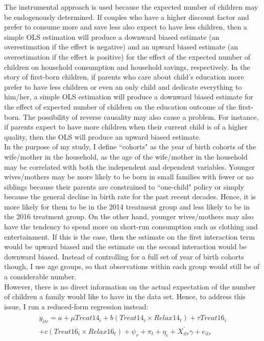 \documentclass[12pt]{extarticle}
\begin{document}
\indent The instrumental approach is used because the expected number of children may be endogenously determined. If couples who have a higher discount factor and prefer to consume more and save less also expect to have less children, then a simple OLS estimation will produce a downward biased estimate (an overestimation if the effect is negative) and an upward biased estimate (an overestimation if the effect is positive) for the effect of the expected number of children on household consumption and household savings, respectively. In the story of first-born children, if parents who care about child's education more prefer to have less children or even an only child and dedicate everything to him/her, a simple OLS estimation will produce a downward biased estimate for the effect of expected number of children on the education outcome of the first-born. The possibility of reverse causality may also cause a problem. For instance, if parents expect to have more children when their current child is of a higher quality, then the OLS will produce an upward biased estimate. \\
\indent In the purpose of my study, I define ``cohorts" as the year of birth cohorts of the wife/mother in the household, as the age of the wife/mother in the household may be correlated with both the independent and dependent variables. Younger wives/mothers may be more likely to be born in small families with fewer or no siblings because their parents are constrained to ``one-child" policy or simply because the general decline in birth rate for the past recent decades. Hence, it is more likely for them to be in the 2014 treatment group and less likely to be in the 2016 treatment group. On the other hand, younger wives/mothers may also have the tendency to spend more on short-run consumption such as clothing and entertainment. If this is the case, then the estimate on the first interaction term would be upward biased and the estimate on the second interaction would be downward biased. Instead of controlling for a full set of year of birth cohorts though, I use age groups, so that observations within each group would still be of a considerable number. \\
\indent However, there is no direct information on the actual expectation of the number of children a family would like to have in the data set. Hence, to address this issue, I run a reduced-form regression instead:
\begin{align}
\begin{split}
y_{itr} = a+\mu{Treat14}_i+b({Treat14}_i \times {Relax14}_t) +\tau{Treat16}_i \\ +c({Treat16}_i \times {Relax16}_t) +\psi_r+\pi_t+\eta_c+X_{itr}^{'}\gamma+e_{itr}
\end{split}
\end{align}
\end{document}
